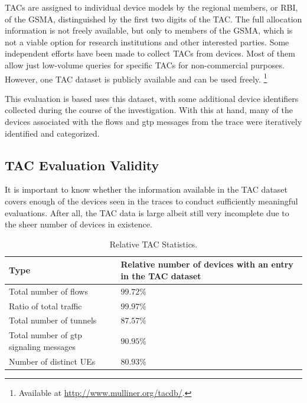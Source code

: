 \glspl{TAC} are assigned to individual device models by the regional members, or \gls{RBI}, of the \gls{GSMA}, distinguished by the first two digits of the \gls{TAC}. The full allocation information is not freely available, but only to members of the \gls{GSMA}, which is not a viable option for research institutions and other interested parties. Some independent efforts have been made to collect \glspl{TAC} from devices. Most of them allow just low-volume queries for specific \glspl{TAC} for non-commercial purposes. However, one \gls{TAC} dataset is publicly available and can be used freely. \footnote{Available at \url{http://www.mulliner.org/tacdb/}.}

This evaluation is based uses this dataset, with some additional device identifiers collected during the course of the investigation. With this at hand, many of the devices associated with the flows and \gls{gtp} messages from the trace were iteratively identified and categorized.



\subsection{\texorpdfstring{\acrshort{TAC}}{TAC} Evaluation Validity}

It is important to know whether the information available in the \gls{TAC} dataset covers enough of the devices seen in the traces to conduct sufficiently meaningful evaluations. After all, the \gls{TAC} data is large albeit still very incomplete due to the sheer number of devices in existence.

\begin{table}
\centering
\caption{Relative \acrshort{TAC} Statistics.}
\label{c4:tbl:tacstats}
	\begin{tabu}{XX[r]}
		\toprule
		\textbf{Type} & \textbf{Relative number of devices with an entry in the \gls{TAC} dataset}\\ 
		\midrule
		Total number of flows & $99.72\%$ \\
		Ratio of total traffic & $99.97\%$\\
		Total number of tunnels & $87.57\%$ \\
		Total number of \gls{gtp} signaling messages & $90.95\%$ \\
		Number of distinct \glspl{UE} & $80.93\%$\\ 
		\bottomrule
	\end{tabu}
\end{table}

